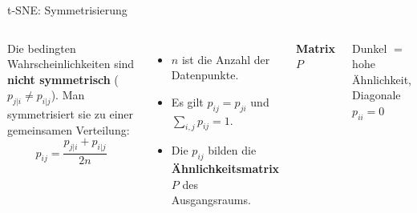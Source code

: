 \begin{frame}{t-SNE: Symmetrisierung}
\footnotesize
\begin{columns}
Die bedingten Wahrscheinlichkeiten sind \textbf{nicht symmetrisch}
($p_{j|i} \neq p_{i|j}$). Man symmetrisiert sie zu einer gemeinsamen
Verteilung:
\[
  p_{ij} = \frac{p_{j|i} + p_{i|j}}{2n}
\]

\begin{itemize}
  \item $n$ ist die Anzahl der Datenpunkte.
  \item Es gilt $p_{ij} = p_{ji}$ und $\sum_{i,j} p_{ij} = 1$.
  \item Die $p_{ij}$ bilden die \textbf{Ähnlichkeitsmatrix} $P$ des
        Ausgangsraums.
\end{itemize}

\centering
\textbf{Matrix $P$}\\[3pt]

{\scriptsize Dunkel $=$ hohe Ähnlichkeit, Diagonale $p_{ii} = 0$}
\end{columns}

\end{frame}

